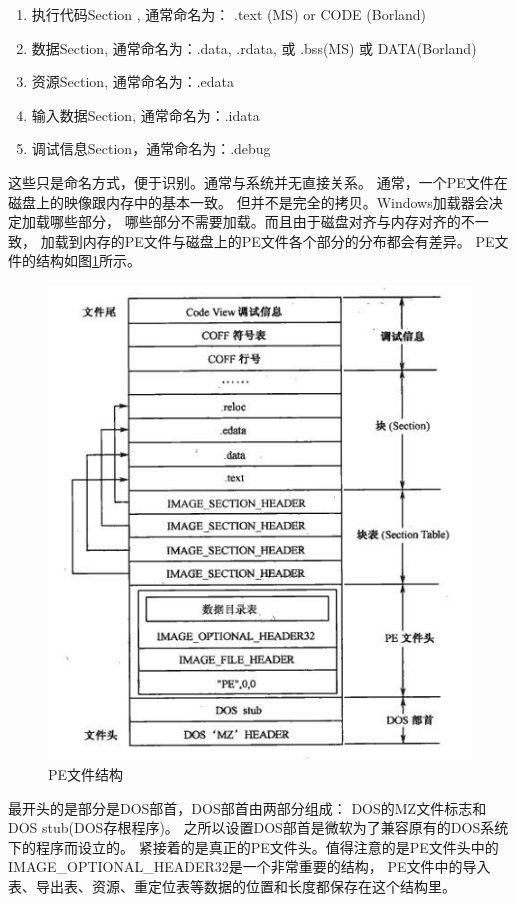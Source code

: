 \documentclass{book}
\begin{document}
\begin{enumerate}
\setcounter{enumi}{0}
\item{执行代码Section , 通常命名为： .text (MS) or CODE (Borland)}
\item{数据Section, 通常命名为：.data, .rdata, 或 .bss(MS) 或 DATA(Borland)}
\item{资源Section, 通常命名为：.edata}
\item{输入数据Section, 通常命名为：.idata}
\item{调试信息Section，通常命名为：.debug}
\end{enumerate}

这些只是命名方式，便于识别。通常与系统并无直接关系。
通常，一个PE文件在磁盘上的映像跟内存中的基本一致。
但并不是完全的拷贝。Windows加载器会决定加载哪些部分，
哪些部分不需要加载。而且由于磁盘对齐与内存对齐的不一致，
加载到内存的PE文件与磁盘上的PE文件各个部分的分布都会有差异。
PE文件的结构如图\ref{fig:PEFileFullStructure}所示。

\begin{figure}[htbp]
	\centering
	\includegraphics[scale=0.8]{PEFileFullStructure.jpg}
	\caption{PE文件结构}
	\label{fig:PEFileFullStructure}
\end{figure}

最开头的是部分是DOS部首，DOS部首由两部分组成：
DOS的MZ文件标志和DOS stub(DOS存根程序)。
之所以设置DOS部首是微软为了兼容原有的DOS系统下的程序而设立的。
紧接着的是真正的PE文件头。值得注意的是PE文件头中的IMAGE\_OPTIONAL\_HEADER32是一个非常重要的结构，
PE文件中的导入表、导出表、资源、重定位表等数据的位置和长度都保存在这个结构里。
\end{document}
